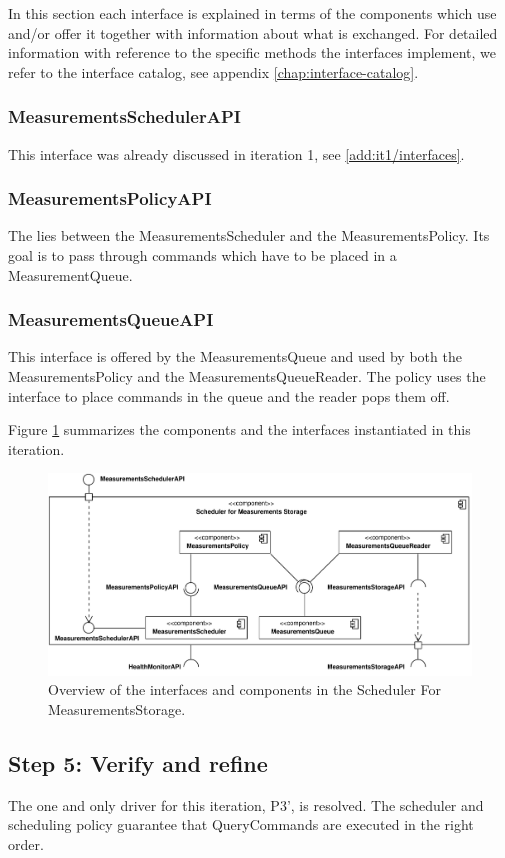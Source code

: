 \npar In this section each interface is explained in terms of the components
which use and/or offer it together with information about what is exchanged. For
detailed information with reference to the specific methods the interfaces
implement, we refer to the interface catalog, see appendix
\ref{chap:interface-catalog}.

\subsubsection{MeasurementsSchedulerAPI}

\npar This interface was already discussed in iteration 1, see
\ref{add:it1/interfaces}.

\subsubsection{MeasurementsPolicyAPI}

\npar The  lies between the
MeasurementsScheduler and the MeasurementsPolicy. Its goal is to pass through
commands which have to be placed in a MeasurementQueue.

\subsubsection{MeasurementsQueueAPI}

\npar This interface is offered by the MeasurementsQueue and used by both the
MeasurementsPolicy and the MeasurementsQueueReader. The policy uses the
interface to place commands in the queue and the reader pops them off.

\npar Figure \ref{fig:it3/interfaces} summarizes the components and the
interfaces instantiated in this iteration.

\begin{figure}[H]
	\begin{centering}
		\includegraphics[width=\textwidth]{figs/add-it3-interfaces.pdf}
		\caption{Overview of the interfaces and components in the Scheduler For
		MeasurementsStorage.}
		\label{fig:it3/interfaces}
	\end{centering}
\end{figure}

\subsection{Step 5: Verify and refine}
\label{add:it3/verification}

\npar The one and only driver for this iteration, P3', is resolved. The
scheduler and scheduling policy guarantee that QueryCommands are executed in the
right order.